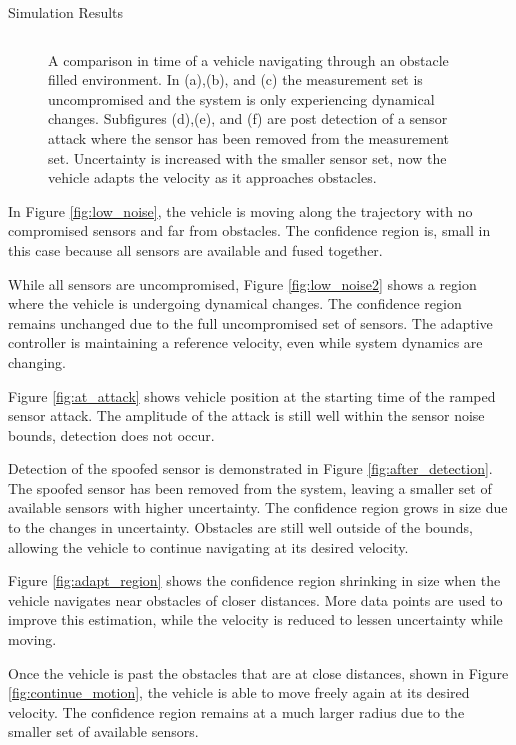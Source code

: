 \begin{section}{Simulation Results}
\begin{figure}[b!th]
\begin{tabular}{ccc}
\end{tabular}
\caption{A comparison in time of a vehicle navigating through an obstacle filled environment. In (a),(b), and (c) the measurement set is uncompromised and the system is only experiencing dynamical changes. Subfigures (d),(e), and (f) are post detection of a sensor attack where the sensor has been removed from the measurement set. Uncertainty is increased with the smaller sensor set, now the vehicle adapts the velocity as it approaches obstacles.}

\end{figure}

In Figure \ref{fig:low_noise}, the vehicle is moving along the trajectory with no compromised sensors and far from obstacles. The confidence region is, small in this case because all sensors are available and fused together. %

While all sensors are uncompromised, Figure \ref{fig:low_noise2} shows a region where the vehicle is undergoing dynamical changes. The confidence region remains unchanged due to the full uncompromised set of sensors. The adaptive controller is maintaining a reference velocity, even while system dynamics are changing.

Figure \ref{fig:at_attack} shows vehicle position at the starting time of the ramped sensor attack. The amplitude of the attack is still well within the sensor noise bounds, detection does not occur.


Detection of the spoofed sensor is demonstrated in Figure \ref{fig:after_detection}. The spoofed sensor has been removed from the system, leaving a smaller set of available sensors with higher uncertainty. The confidence region grows in size due to the changes in uncertainty. Obstacles are still well outside of the bounds, allowing the vehicle to continue navigating at its desired velocity.

Figure \ref{fig:adapt_region} shows the confidence region shrinking in size when the vehicle navigates near obstacles of closer distances. More data points are used to improve this estimation, while the velocity is reduced to lessen uncertainty while moving.

Once the vehicle is past the obstacles that are at close distances, shown in Figure \ref{fig:continue_motion}, the vehicle is able to move freely again at its desired velocity. The confidence region remains at a much larger radius due to the smaller set of available sensors.


\end{section}
